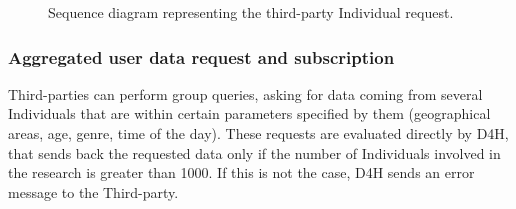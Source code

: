             \begin{figure}[H]
                \centering
                \caption{Sequence diagram representing the third-party Individual request.}
                \label{fig:IndividualRequest}
            \end{figure}
            
        
            
        \subsubsection{Aggregated user data request and subscription}
            Third-parties can perform group queries, asking for data coming from several Individuals that are within certain parameters specified by them (geographical areas, age, genre, time of the day). These requests are evaluated directly by D4H, that sends back the requested data only if the number of Individuals involved in the research is greater than 1000. If this is not the case, D4H sends an error message to the Third-party.

